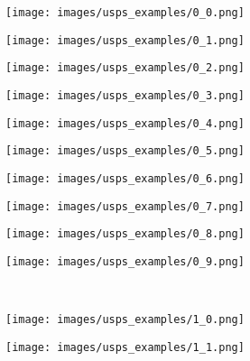 \begin{figure}[t]
 \centering
 \begin{subfigure}[c]{0.07\textwidth}
  \centering
  \texttt{[image: images/usps\_examples/0\_0.png]}
 \end{subfigure}
 \begin{subfigure}[c]{0.07\textwidth}
  \centering
  \texttt{[image: images/usps\_examples/0\_1.png]}
 \end{subfigure}
 \begin{subfigure}[c]{0.07\textwidth}
  \centering
  \texttt{[image: images/usps\_examples/0\_2.png]}
 \end{subfigure}
 \begin{subfigure}[c]{0.07\textwidth}
  \centering
  \texttt{[image: images/usps\_examples/0\_3.png]}
 \end{subfigure}
 \begin{subfigure}[c]{0.07\textwidth}
  \centering
  \texttt{[image: images/usps\_examples/0\_4.png]}
 \end{subfigure}
 \begin{subfigure}[c]{0.07\textwidth}
  \centering
  \texttt{[image: images/usps\_examples/0\_5.png]}
 \end{subfigure}
 \begin{subfigure}[c]{0.07\textwidth}
  \centering
  \texttt{[image: images/usps\_examples/0\_6.png]}
 \end{subfigure}
 \begin{subfigure}[c]{0.07\textwidth}
  \centering
  \texttt{[image: images/usps\_examples/0\_7.png]}
 \end{subfigure}
 \begin{subfigure}[c]{0.07\textwidth}
  \centering
  \texttt{[image: images/usps\_examples/0\_8.png]}
 \end{subfigure}
 \begin{subfigure}[c]{0.07\textwidth}
  \centering
  \texttt{[image: images/usps\_examples/0\_9.png]}
 \end{subfigure}
 \\
 \begin{subfigure}[c]{0.07\textwidth}
  \centering
  \texttt{[image: images/usps\_examples/1\_0.png]}
 \end{subfigure}
 \begin{subfigure}[c]{0.07\textwidth}
  \centering
  \texttt{[image: images/usps\_examples/1\_1.png]}

\end{subfigure}
\end{figure}

